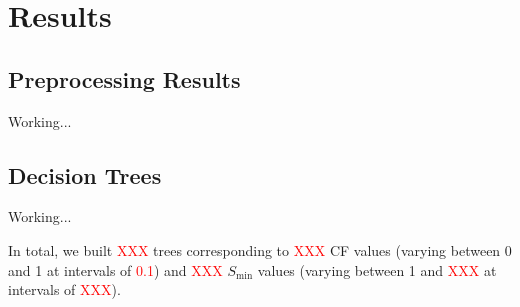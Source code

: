 
\section{Results}
\label{sec:results}

\subsection{Preprocessing Results}

Working...

\subsection{Decision Trees}

Working...

In total, we built \textcolor{red}{XXX} trees corresponding to \textcolor{red}{XXX} CF values (varying between 0 and 1 at intervals of \textcolor{red}{0.1}) and \textcolor{red}{XXX} $S_{\min}$ values (varying between 1 and \textcolor{red}{XXX} at intervals of \textcolor{red}{XXX}). 


% 

% 
